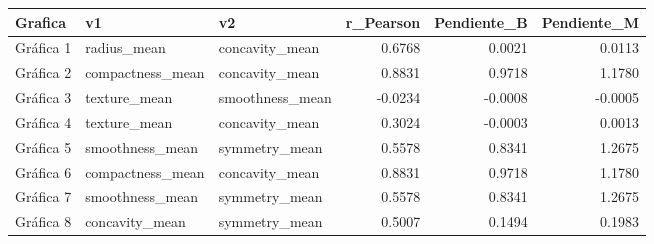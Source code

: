 \begin{tabular}{lllrrr}
\toprule
Grafica & v1 & v2 & r\_Pearson & Pendiente\_B & Pendiente\_M \\
\midrule
Gráfica 1 & radius\_mean & concavity\_mean & 0.6768 & 0.0021 & 0.0113 \\
Gráfica 2 & compactness\_mean & concavity\_mean & 0.8831 & 0.9718 & 1.1780 \\
Gráfica 3 & texture\_mean & smoothness\_mean & -0.0234 & -0.0008 & -0.0005 \\
Gráfica 4 & texture\_mean & concavity\_mean & 0.3024 & -0.0003 & 0.0013 \\
Gráfica 5 & smoothness\_mean & symmetry\_mean & 0.5578 & 0.8341 & 1.2675 \\
Gráfica 6 & compactness\_mean & concavity\_mean & 0.8831 & 0.9718 & 1.1780 \\
Gráfica 7 & smoothness\_mean & symmetry\_mean & 0.5578 & 0.8341 & 1.2675 \\
Gráfica 8 & concavity\_mean & symmetry\_mean & 0.5007 & 0.1494 & 0.1983 \\
\bottomrule
\end{tabular}
